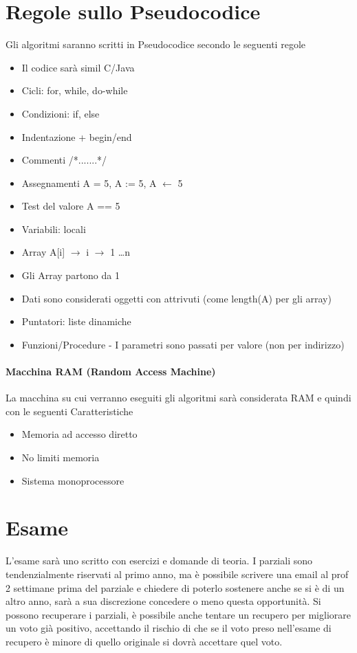 \section{Regole sullo Pseudocodice}
Gli algoritmi saranno scritti in Pseudocodice secondo le seguenti regole
\begin{itemize}
    \item Il codice sarà simil C/Java
    \item Cicli: for, while, do-while
    \item Condizioni: if, else
    \item Indentazione + begin/end
    \item Commenti /*.......*/
    \item Assegnamenti A = 5, A := 5, A $\leftarrow$ 5
    \item Test del valore A == 5
    \item Variabili: locali
    \item Array A[i] $\rightarrow$ i $\rightarrow$ 1 \dots n
    \item Gli Array partono da 1
    \item Dati sono considerati oggetti con attrivuti (come length(A) per gli array)
    \item Puntatori: liste dinamiche
    \item Funzioni/Procedure - I parametri sono passati per valore (non per indirizzo)
\end{itemize}

\paragraph{Macchina RAM (Random Access Machine)}
La macchina su cui verranno eseguiti gli algoritmi sarà considerata RAM e quindi con le seguenti Caratteristiche
\begin{itemize}
    \item Memoria ad accesso diretto
    \item No limiti memoria
    \item Sistema monoprocessore
\end{itemize}

\section{Esame}
L'esame sarà uno scritto con esercizi e domande di teoria. 
I parziali sono tendenzialmente riservati al primo anno, ma è possibile scrivere una email al prof 2 settimane prima del parziale e chiedere di poterlo sostenere
anche se si è di un altro anno, sarà a sua discrezione concedere o meno questa opportunità.
Si possono recuperare i parziali, è possibile anche tentare un recupero per migliorare un voto già positivo, accettando il rischio di
che se il voto preso nell'esame di recupero è minore di quello originale si dovrà accettare quel voto.


